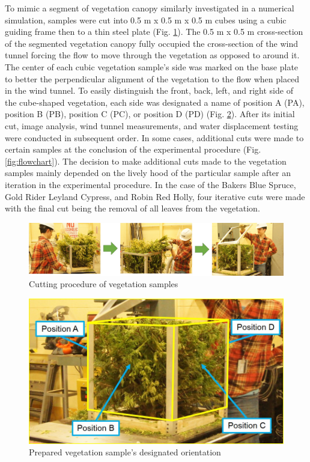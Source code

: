 \documentclass[12pt]{article}
\begin{document}
To mimic a segment of vegetation canopy similarly investigated in a numerical simulation, samples were cut  into 0.5 m x 0.5 m x 0.5 m cubes using a cubic guiding frame then to a thin steel plate (Fig. \ref{fig:Sampleprep}). The 0.5 m x 0.5 m cross-section of the segmented vegetation canopy fully occupied the cross-section of the wind tunnel forcing the flow to move through the vegetation as opposed to around it. The center of each cubic vegetation sample's side was marked on the base plate to better the perpendicular alignment of the vegetation to the flow when placed in the wind tunnel. To easily distinguish the front, back, left, and right side of the cube-shaped vegetation, each side was designated a name of position A (PA), position B (PB), position C (PC), or position D (PD) (Fig. \ref{fig:Vegpos}). After its initial cut, image analysis, wind tunnel measurements, and water displacement testing were conducted in subsequent order. In some cases, additional cuts were made to certain samples at the conclusion of the experimental procedure (Fig. \ref{fig:flowchart}). The decision to make additional cuts made to the vegetation samples mainly depended on the lively hood of the particular sample after an iteration in the experimental procedure. In the case of the Bakers Blue Spruce, Gold Rider Leyland Cypress, and Robin Red Holly, four iterative cuts were made with the final cut being the removal of all leaves from the vegetation.

\begin{figure} [h]
	\centering 	\includegraphics[width=1.0\linewidth]{Picture2.jpg}
	\caption{Cutting procedure of vegetation samples}
	\label{fig:Sampleprep}
\end{figure}

\begin{figure} [!]
	\centering 	\includegraphics[width=1.0\linewidth]{Picture3.jpg}
	\caption{Prepared vegetation sample's designated orientation}
	\label{fig:Vegpos}
\end{figure}
\end{document}
